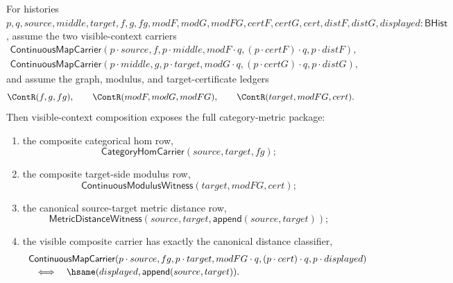 \begin{theorem}
\label{thm:continuousmap-visible-context-composition-category-metric-exactness}
For histories
$p,q,source,middle,target,f,g,fg,modF,modG,modFG,certF,certG,cert,distF,distG,displayed:\mathsf{BHist}$,
assume the two visible-context carriers
$$
\begin{array}{l}
\mathsf{ContinuousMapCarrier}(p\cdot source,f,p\cdot middle,modF\cdot q,
(p\cdot certF)\cdot q,p\cdot distF),\\
\mathsf{ContinuousMapCarrier}(p\cdot middle,g,p\cdot target,modG\cdot q,
(p\cdot certG)\cdot q,p\cdot distG),
\end{array}
$$
and assume the graph, modulus, and target-certificate ledgers
$$
\ContR(f,g,fg),\qquad
\ContR(modF,modG,modFG),\qquad
\ContR(target,modFG,cert).
$$
Then visible-context composition exposes the full category-metric package:
\begin{enumerate}
\item the composite categorical hom row,
$$
\mathsf{CategoryHomCarrier}(source,target,fg);
$$

\item the composite target-side modulus row,
$$
\mathsf{ContinuousModulusWitness}(target,modFG,cert);
$$

\item the canonical source-target metric distance row,
$$
\mathsf{MetricDistanceWitness}(source,target,\mathsf{append}(source,target));
$$

\item the visible composite carrier has exactly the canonical distance
classifier,
$$
\begin{array}{l}
\mathsf{ContinuousMapCarrier}(p\cdot source,fg,p\cdot target,modFG\cdot q,
(p\cdot cert)\cdot q,p\cdot displayed)
\\[2pt]
\quad\Longleftrightarrow\quad
\hsame(displayed,\mathsf{append}(source,target)).
\end{array}
$$
\end{enumerate}
\end{theorem}

